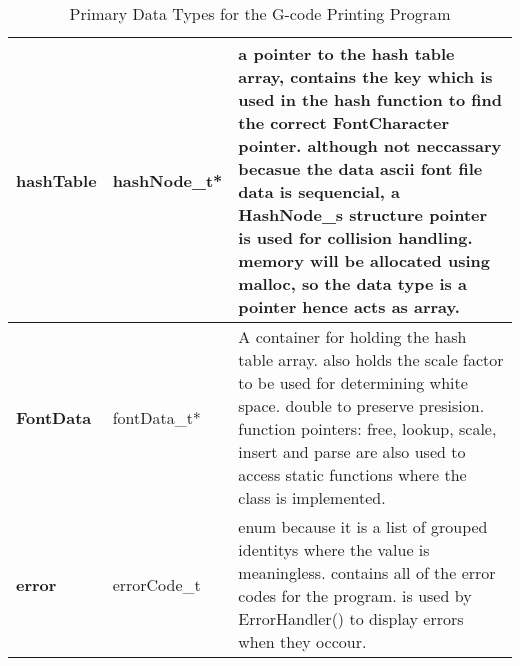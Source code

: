 \begin{table}[H]
{\begin{tabular}{|>{\raggedright\arraybackslash}m{}|>{\raggedright\arraybackslash}m{}|>{\raggedright\arraybackslash}m{}|}
    \textbf{hashTable} & 
    hashNode\_t*
    & a pointer to the hash table array, contains the key which is used in the hash function to find the correct FontCharacter pointer. although not neccassary becasue the data ascii font file data is sequencial, a HashNode\_s structure pointer is used for collision handling. memory will be allocated using malloc, so the data type is a pointer hence acts as array.\\ \hline
    
    \textbf{FontData}& 
    fontData\_t*
    & A container for holding the hash table array. also holds the scale factor to be used for determining white space. double to preserve presision. function pointers: free, lookup, scale, insert and parse are also used to access static functions where the class is implemented.\\ \hline
 \textbf{error}& errorCode\_t & enum because it is a list of grouped identitys where the value is meaningless. contains all of the error codes for the program. is used by ErrorHandler() to display errors when they occour. \\ \hline
    \end{tabular}
    }
    \caption{Primary Data Types for the G-code Printing Program}
    \label{tab:data_types}
    \end{table}


